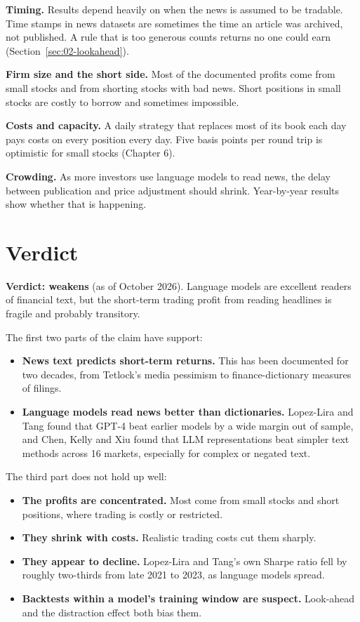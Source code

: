 \textbf{Timing.} Results depend heavily on when the news is assumed to be tradable. Time stamps in news datasets are sometimes the time an article was archived, not published. A rule that is too generous counts returns no one could earn (Section~\ref{sec:02-lookahead}).

\textbf{Firm size and the short side.} Most of the documented profits come from small stocks and from shorting stocks with bad news. Short positions in small stocks are costly to borrow and sometimes impossible.

\textbf{Costs and capacity.} A daily strategy that replaces most of its book each day pays costs on every position every day. Five basis points per round trip is optimistic for small stocks (Chapter 6).

\textbf{Crowding.} As more investors use language models to read news, the delay between publication and price adjustment should shrink. Year-by-year results show whether that is happening.

\section{Verdict}
\label{sec:23-verdict}

\begin{callout}
\textbf{Verdict: weakens} (as of October 2026). Language models are excellent readers of financial text, but the short-term trading profit from reading headlines is fragile and probably transitory.
\end{callout}

The first two parts of the claim have support:

\begin{itemize}
  \item \textbf{News text predicts short-term returns.} This has been documented for two decades, from Tetlock's media pessimism to finance-dictionary measures of filings.
  \item \textbf{Language models read news better than dictionaries.} Lopez-Lira and Tang found that GPT-4 beat earlier models by a wide margin out of sample, and Chen, Kelly and Xiu found that LLM representations beat simpler text methods across 16 markets, especially for complex or negated text.
\end{itemize}

The third part does not hold up well:

\begin{itemize}
  \item \textbf{The profits are concentrated.} Most come from small stocks and short positions, where trading is costly or restricted.
  \item \textbf{They shrink with costs.} Realistic trading costs cut them sharply.
  \item \textbf{They appear to decline.} Lopez-Lira and Tang's own Sharpe ratio fell by roughly two-thirds from late 2021 to 2023, as language models spread.
  \item \textbf{Backtests within a model's training window are suspect.} Look-ahead and the distraction effect both bias them.
\end{itemize}

